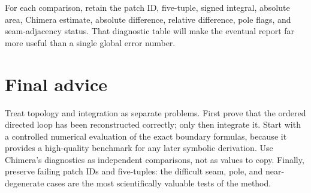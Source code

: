 \documentclass[11pt]{article}
\begin{document}
For each comparison, retain the patch ID, five-tuple, signed integral, absolute
area, Chimera estimate, absolute difference, relative difference, pole flags,
and seam-adjacency status.  That diagnostic table will make the eventual report
far more useful than a single global error number.

\section{Final advice}

Treat topology and integration as separate problems.  First prove that the
ordered directed loop has been reconstructed correctly; only then integrate it.
Start with a controlled numerical evaluation of the exact boundary formulas,
because it provides a high-quality benchmark for any later symbolic derivation.
Use Chimera's diagnostics as independent comparisons, not as values to copy.
Finally, preserve failing patch IDs and five-tuples: the difficult seam, pole,
and near-degenerate cases are the most scientifically valuable tests of the
method.
\end{document}

